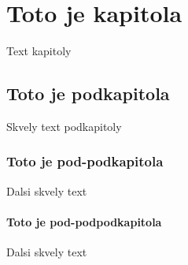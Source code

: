 \documentclass{book}
\begin{document}
\chapter{Toto je kapitola}
Text kapitoly

\section{Toto je podkapitola}
Skvely text podkapitoly

\subsection{Toto je pod-podkapitola}
Dalsi skvely text

\subsubsection{Toto je pod-podpodkapitola}
Dalsi skvely text
\end{document}
